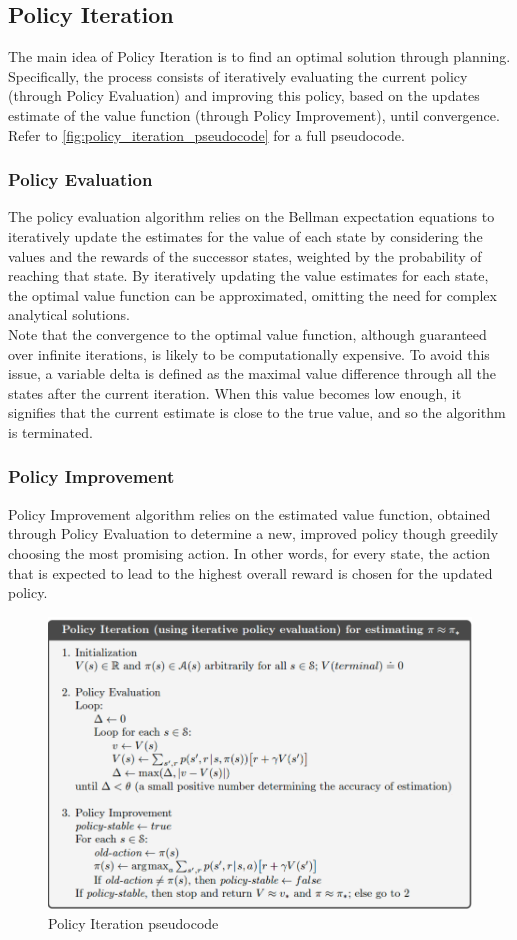 \documentclass{class}
\begin{document}
\subsection{Policy Iteration}
The main idea of Policy Iteration is to find an optimal solution through planning. Specifically, the process consists of iteratively evaluating the current policy (through Policy Evaluation) and improving this policy, based on the updates estimate of the value function (through Policy Improvement), until convergence.\\[0.3cm]
Refer to \autoref{fig:policy_iteration_pseudocode} for a full pseudocode.

\subsubsection{Policy Evaluation}
The policy evaluation algorithm relies on the Bellman expectation equations to iteratively update the estimates for the value of each state by considering the values and the rewards of the successor states, weighted by the probability of reaching that state. By iteratively updating the value estimates for each state, the optimal value function can be approximated, omitting the need for complex analytical solutions.
\\[0.3cm]
Note that the convergence to the optimal value function, although guaranteed over infinite iterations, is likely to be computationally expensive. To avoid this issue, a variable delta is defined as the maximal value difference through all the states after the current iteration. When this value becomes low enough, it signifies that the current estimate is close to the true value, and so the algorithm is terminated.

\subsubsection{Policy Improvement}
Policy Improvement algorithm relies on the estimated value function, obtained through Policy Evaluation to determine a new, improved policy though greedily choosing the most promising action. In other words, for every state, the action that is expected to lead to the highest overall reward is chosen for the updated policy.
\begin{figure}[H]
    \centering
    \includegraphics[width=0.5\linewidth]{images/policy_iteration_pseudocode.png}
    \caption{Policy Iteration pseudocode \parencite[p. 80]{sutton-2018}}
    \label{fig:policy_iteration_pseudocode}
\end{figure}
\end{document}
